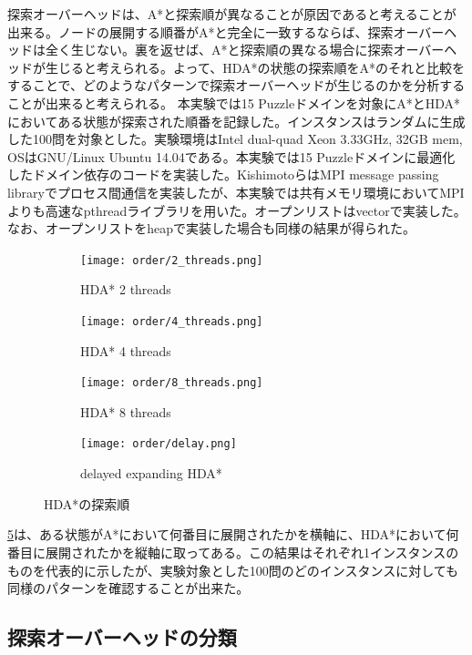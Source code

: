 \documentclass{jsarticle}
\begin{document}
探索オーバーヘッドは、A*と探索順が異なることが原因であると考えることが出来る。ノードの展開する順番がA*と完全に一致するならば、探索オーバーヘッドは全く生じない。裏を返せば、A*と探索順の異なる場合に探索オーバーヘッドが生じると考えられる。よって、HDA*の状態の探索順をA*のそれと比較をすることで、どのようなパターンで探索オーバーヘッドが生じるのかを分析することが出来ると考えられる。
本実験では15 Puzzleドメインを対象にA*とHDA*においてある状態が探索された順番を記録した。インスタンスはランダムに生成した100問を対象とした。実験環境はIntel dual-quad Xeon 3.33GHz, 32GB mem, OSはGNU/Linux Ubuntu 14.04である。本実験では15 Puzzleドメインに最適化したドメイン依存のコードを実装した。KishimotoらはMPI message passing libraryでプロセス間通信を実装したが、本実験では共有メモリ環境においてMPIよりも高速なpthreadライブラリを用いた。オープンリストはvectorで実装した。なお、オープンリストをheapで実装した場合も同様の結果が得られた。


\begin{figure}
	\begin{subfigure}{0.4\columnwidth}
		\centering
		\texttt{[image: order/2\_threads.png]}
		\label{fig:order:2_threads}
		\caption{HDA* 2 threads}
	\end{subfigure}
	\begin{subfigure}{0.4\columnwidth}
		\centering
		\texttt{[image: order/4\_threads.png]}
		\label{fig:order:4_threads}
		\caption{HDA* 4 threads}
	\end{subfigure}
	\begin{subfigure}{0.4\columnwidth}
		\centering
		\texttt{[image: order/8\_threads.png]}
		\label{fig:order:8_t8hreads}
		\caption{HDA* 8 threads}
	\end{subfigure}
	\begin{subfigure}{0.4\columnwidth}
		\centering
		\texttt{[image: order/delay.png]}
		\label{fig:order:delay}
		\caption{delayed expanding HDA*}
	\end{subfigure}
	\label{fig:hdastar_orders}
	\caption{HDA*の探索順}
\end{figure}%


\ref{fig:hdastar_orders}は、ある状態がA*において何番目に展開されたかを横軸に、HDA*において何番目に展開されたかを縦軸に取ってある。この結果はそれぞれ1インスタンスのものを代表的に示したが、実験対象とした100問のどのインスタンスに対しても同様のパターンを確認することが出来た。

\subsection{探索オーバーヘッドの分類}
\end{document}
